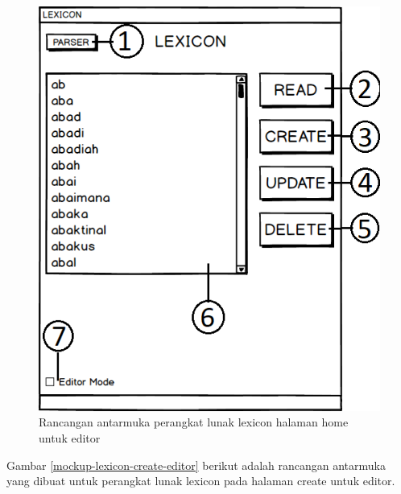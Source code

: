 \begin{figure}[H]
\centering
\includegraphics[scale=0.8]{Gambar/mockup-lexicon-home-editor}
\caption{Rancangan antarmuka perangkat lunak lexicon halaman home untuk editor} 
\label{mockup-lexicon-home-editor}
\end{figure}

Gambar \ref{mockup-lexicon-create-editor} berikut adalah rancangan antarmuka yang dibuat untuk perangkat lunak lexicon pada halaman create untuk editor.

